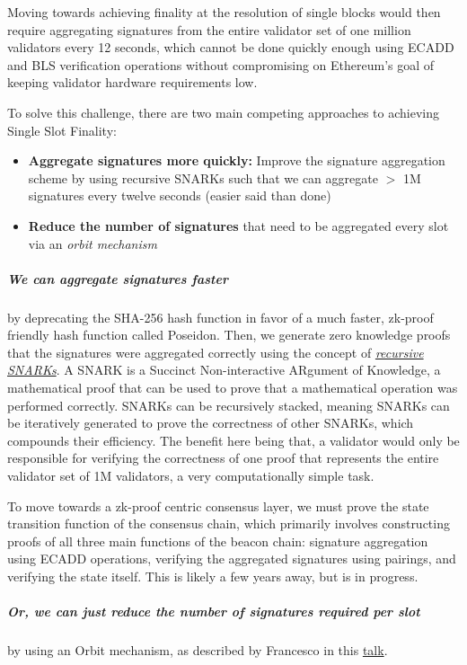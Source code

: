 \documentclass[12pt]{article}
\begin{document}
Moving towards achieving finality at the resolution of single blocks would then require aggregating signatures from the entire validator set of one million validators every 12 seconds, which cannot be done quickly enough using ECADD and BLS verification operations without compromising on Ethereum's goal of keeping validator hardware requirements low. 

To solve this challenge, there are two main competing approaches to achieving Single Slot Finality: 

\begin{itemize}
    \item \textbf{Aggregate signatures more quickly:} Improve the signature aggregation scheme by using recursive SNARKs such that we can aggregate $>$ 1M signatures every twelve seconds (easier said than done)
    \item \textbf{Reduce the number of signatures} that need to be aggregated every slot via an \textit{orbit mechanism}
\end{itemize}

\subparagraph{We can aggregate signatures faster} by deprecating the SHA-256 hash function in favor of a much faster, zk-proof friendly hash function called Poseidon. Then, we generate zero knowledge proofs that the signatures were aggregated correctly using the concept of \href{https://hackmd.io/dR4V2ZJmSfC4VNFob_2lRA#52-SNARK-2-Hash-based-recusive-SNARK-to-replace-BLS-Sig-Aggregation}{\textit{recursive SNARKs}}. A SNARK is a Succinct Non-interactive ARgument of Knowledge, a mathematical proof that can be used to prove that a mathematical operation was performed correctly.  SNARKs can be recursively stacked, meaning SNARKs can be iteratively generated to prove the correctness of other SNARKs, which compounds their efficiency. The benefit here being that, a validator would only be responsible for verifying the correctness of one proof that represents the entire validator set of 1M validators, a very computationally simple task. 

To move towards a zk-proof centric consensus layer, we must prove the state transition function of the consensus chain, which primarily involves constructing proofs of all three main functions of the beacon chain: signature aggregation using ECADD operations, verifying the aggregated signatures using pairings, and verifying the state itself. This is likely a few years away, but is in progress. 

\subparagraph{Or, we can just reduce the number of signatures required per slot} by using an Orbit mechanism, as described by Francesco in this \href{https://youtu.be/6VEEAemYaeI?si=4Jm8hafnxuHfrFzt}{talk}.  
\end{document}
